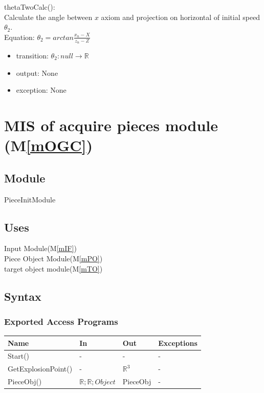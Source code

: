 \documentclass[12pt, titlepage]{article}
\newcommand{\mref}[1]{M\ref{#1}}
\begin{document}
\noindent thetaTwoCalc():\\
Calculate the angle between $x$ axiom and projection on horizontal of initial speed $\theta_{2}$.\\
Equation: $\theta_{2}=arctan \frac{x_{n}-X}{z_{n}-Z}$\\
\begin{itemize}
	\item transition: $\theta_{2}: null \to \mathbb{R}$  
	\item output: None
	\item exception: None
\end{itemize}

\section{MIS of acquire pieces module (\mref{mOGC})} 

\subsection{Module}

PieceInitModule

\subsection{Uses}

Input Module(\mref{mIF})\\
Piece Object Module(\mref{mPO})\\
target object module(\mref{mTO})\\

\subsection{Syntax}

\subsubsection{Exported Access Programs}

\begin{center}
	\begin{tabular}{p{2cm} p{4cm} p{4cm} p{2cm}}
		\hline
		\textbf{Name} & \textbf{In} & \textbf{Out} & \textbf{Exceptions} \\
		\hline
		Start() & - & - & -\\
		GetExplosionPoint() & - & $\mathbb{R}^{3}$ & -\\
		PieceObj() & $\mathbb{R};\mathbb{R};Object$ & PieceObj & -\\
		\hline		
	\end{tabular}
\end{center}
\end{document}
